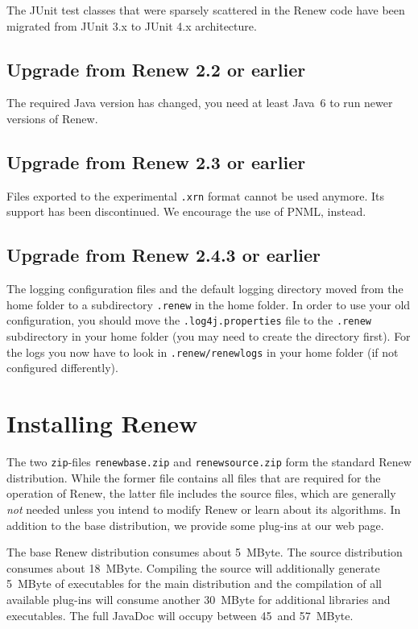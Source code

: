 The JUnit test classes that were sparsely scattered in the Renew code have
been migrated from JUnit 3.x to JUnit 4.x architecture.

\subsection{Upgrade from Renew 2.2 or earlier}

The required Java version has changed, you need at least
Java~6 to run newer versions of Renew.

\subsection{Upgrade from Renew 2.3 or earlier}

Files exported to the experimental \texttt{.xrn} format cannot be used
anymore. Its support has been discontinued. We encourage the use of
PNML, instead.

\subsection{Upgrade from Renew 2.4.3 or earlier}

The logging configuration files and the default logging directory moved from the home folder to a
subdirectory \texttt{.renew} in the home folder. In order to use your
old configuration, you should move the \texttt{.log4j.properties} file
to the \texttt{.renew} subdirectory in your home folder (you may need
to create the directory first). 
For the logs you now have to look in \texttt{.renew/renewlogs} in your home folder (if not configured differently).


\section{Installing Renew}
\label{sec:install}

The two \texttt{zip}-files \texttt{renew\renewversion base.zip} and
\texttt{renew\renewversion source.zip} form the standard 
Renew distribution. While the former file contains all
files that are required for the operation of Renew, the latter file
includes the source files, which are generally \emph{not} needed 
unless you intend to modify Renew or learn about its algorithms. 
In addition to the base distribution, we provide some plug-ins
at our web page.

The base Renew distribution consumes about 5~MByte. 
The source distribution consumes about 18~MByte.
Compiling the source will additionally generate 5~MByte of executables
for the main distribution and the compilation of all available plug-ins
will consume another 30~MByte for additional libraries and
executables.  
The full JavaDoc will occupy between 45~and 57~MByte.

